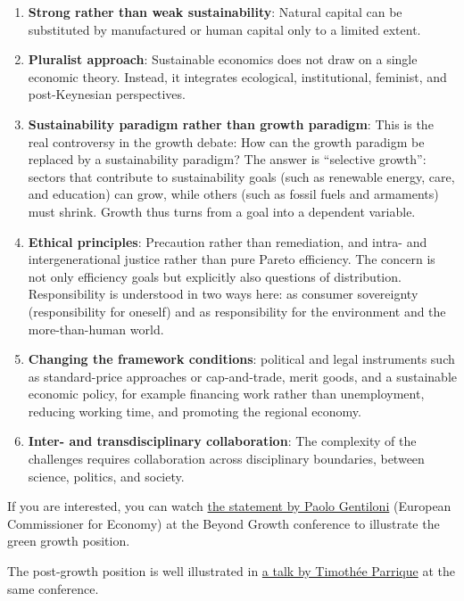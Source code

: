 \documentclass[
  british,
  a4paper,
  DIV=11,
  numbers=noendperiod,
  oneside,
  openany]{scrreprt}
\begin{document}
\begin{enumerate}
\def\labelenumi{\arabic{enumi}.}
\item
  \textbf{Strong rather than weak sustainability}: Natural capital can
  be substituted by manufactured or human capital only to a limited
  extent.
\item
  \textbf{Pluralist approach}: Sustainable economics does not draw on a
  single economic theory. Instead, it integrates ecological,
  institutional, feminist, and post-Keynesian perspectives.
\item
  \textbf{Sustainability paradigm rather than growth paradigm}: This is
  the real controversy in the growth debate: How can the growth paradigm
  be replaced by a sustainability paradigm? The answer is ``selective
  growth'': sectors that contribute to sustainability goals (such as
  renewable energy, care, and education) can grow, while others (such as
  fossil fuels and armaments) must shrink. Growth thus turns from a goal
  into a dependent variable.
\item
  \textbf{Ethical principles}: Precaution rather than remediation, and
  intra- and intergenerational justice rather than pure Pareto
  efficiency. The concern is not only efficiency goals but explicitly
  also questions of distribution. Responsibility is understood in two
  ways here: as consumer sovereignty (responsibility for oneself) and as
  responsibility for the environment and the more-than-human world.
\item
  \textbf{Changing the framework conditions}: political and legal
  instruments such as standard-price approaches or cap-and-trade, merit
  goods, and a sustainable economic policy, for example financing work
  rather than unemployment, reducing working time, and promoting the
  regional economy.
\item
  \textbf{Inter- and transdisciplinary collaboration}: The complexity of
  the challenges requires collaboration across disciplinary boundaries,
  between science, politics, and society.
\end{enumerate}

\begin{tcolorbox}[enhanced jigsaw, arc=.35mm, bottomrule=.15mm, bottomtitle=1mm, breakable, colback=white, colbacktitle=quarto-callout-note-color!10!white, colframe=quarto-callout-note-color-frame, coltitle=black, left=2mm, leftrule=.75mm, opacityback=0, opacitybacktitle=0.6, rightrule=.15mm, title={Further reading}, titlerule=0mm, toprule=.15mm, toptitle=1mm]

If you are interested, you can watch
\href{https://www.youtube.com/watch?v=2rYNewZEazA&t=1129s}{the statement
by Paolo Gentiloni} (European Commissioner for Economy) at the Beyond
Growth conference to illustrate the green growth position.

The post-growth position is well illustrated in
\href{https://www.youtube.com/watch?v=vij3Q6bE6X4}{a talk by Timothée
Parrique} at the same conference.

\end{tcolorbox}
\end{document}
